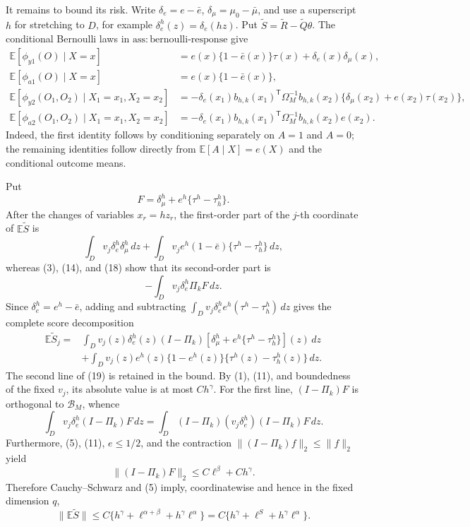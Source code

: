 It remains to bound its risk.  Write \(\delta_e=e-\bar e\), \(\delta_\mu=\mu_0-\bar\mu\), and use a superscript \(h\) for stretching to \(D\), for example \(\delta_e^h(z)=\delta_e(hz)\).  Put \(\widetilde S=\widetilde R-\widetilde Q\theta\).  The conditional Bernoulli laws in \(\mathrm{ass:bernoulli\mbox{-}response}\) give
\[
 \begin{split}
 \mathbb E[\phi_{y1}(O)\mid X=x]
 &=e(x)\{1-\bar e(x)\}\tau(x)+\delta_e(x)\delta_\mu(x),\\
 \mathbb E[\phi_{a1}(O)\mid X=x]
 &=e(x)\{1-\bar e(x)\},\\
 \mathbb E[\phi_{y2}(O_1,O_2)\mid X_1=x_1,X_2=x_2]
 &=-\delta_e(x_1)b_{h,k}(x_1)^{\mathsf T}\Omega_M^{-1}b_{h,k}(x_2)
 \{\delta_\mu(x_2)+e(x_2)\tau(x_2)\},\\
 \mathbb E[\phi_{a2}(O_1,O_2)\mid X_1=x_1,X_2=x_2]
 &=-\delta_e(x_1)b_{h,k}(x_1)^{\mathsf T}\Omega_M^{-1}b_{h,k}(x_2)e(x_2).
 \end{split}
 \tag{18}
\]
Indeed, the first identity follows by conditioning separately on \(A=1\) and \(A=0\); the remaining identities follow directly from \(\mathbb E[A\mid X]=e(X)\) and the conditional outcome means.

Put
\[
 F=\delta_\mu^h+e^h\{\tau^h-\tau_h^h\}.
\]
After the changes of variables \(x_r=hz_r\), the first-order part of the \(j\)-th coordinate of \(\mathbb E\widetilde S\) is
\[
 \int_D v_j\delta_e^h\delta_\mu^h\,dz
 +\int_D v_j e^h(1-\bar e)\{\tau^h-\tau_h^h\}\,dz,
\]
whereas (3), (14), and (18) show that its second-order part is
\[
 -\int_Dv_j\delta_e^h\Pi_kF\,dz.
\]
Since \(\delta_e^h=e^h-\bar e\), adding and subtracting \(\int_Dv_j\delta_e^he^h(\tau^h-\tau_h^h)\,dz\) gives the complete score decomposition
\[
 \begin{split}
 \mathbb E\widetilde S_j
 ={}&\int_Dv_j(z)\delta_e^h(z)(I-\Pi_k)
 \left[\delta_\mu^h+e^h\{\tau^h-\tau_h^h\}\right](z)\,dz\\
 &+\int_Dv_j(z)e^h(z)\{1-e^h(z)\}
 \{\tau^h(z)-\tau_h^h(z)\}\,dz.
 \end{split}
 \tag{19}
\]
The second line of (19) is retained in the bound.  By (1), (11), and boundedness of the fixed \(v_j\), its absolute value is at most \(Ch^\gamma\).  For the first line, \((I-\Pi_k)F\) is orthogonal to \(\mathcal B_M\), whence
\[
 \int_Dv_j\delta_e^h(I-\Pi_k)F\,dz
 =\int_D(I-\Pi_k)(v_j\delta_e^h)(I-\Pi_k)F\,dz.
\]
Furthermore, (5), (11), \(e\leq1/2\), and the contraction \(\|(I-\Pi_k)f\|_2\leq\|f\|_2\) yield
\[
 \|(I-\Pi_k)F\|_2
 \leq C\ell^\beta+Ch^\gamma.
\]
Therefore Cauchy--Schwarz and (5) imply, coordinatewise and hence in the fixed dimension \(q\),
\[
 \|\mathbb E\widetilde S\|
 \leq C\{h^\gamma+\ell^{\alpha+\beta}+h^\gamma\ell^\alpha\}
 =C\{h^\gamma+\ell^S+h^\gamma\ell^\alpha\}.
 \tag{20}
\]

